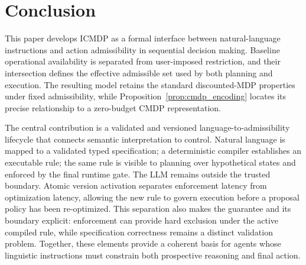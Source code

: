 \documentclass[journal]{IEEEtran}
\theoremstyle{definition}
\begin{document}
\section{Conclusion}
\label{sec:conclusion}

This paper develops ICMDP as a formal interface between natural-language
instructions and action admissibility in sequential decision making. Baseline
operational availability is separated from user-imposed restriction, and their
intersection defines the effective admissible set used by both planning and
execution.
The resulting model retains the standard discounted-MDP properties under fixed
admissibility, while Proposition~\ref{prop:cmdp_encoding} locates its precise
relationship to a zero-budget CMDP representation.

The central contribution is a validated and versioned
language-to-admissibility lifecycle that connects semantic interpretation to
control. Natural language is mapped to a validated typed specification; a
deterministic compiler establishes an executable rule; the same rule is visible
to planning over hypothetical states and enforced by the final runtime gate.
The LLM remains outside the trusted boundary. Atomic version activation
separates enforcement latency from optimization latency, allowing the new rule
to govern execution before a proposal policy has been re-optimized. This
separation also makes the guarantee and its boundary explicit: enforcement can
provide hard exclusion under the active compiled rule, while specification
correctness remains a distinct validation problem. Together, these elements
provide a coherent basis for agents whose linguistic instructions must
constrain both prospective reasoning and final action.


% 

\end{document}
